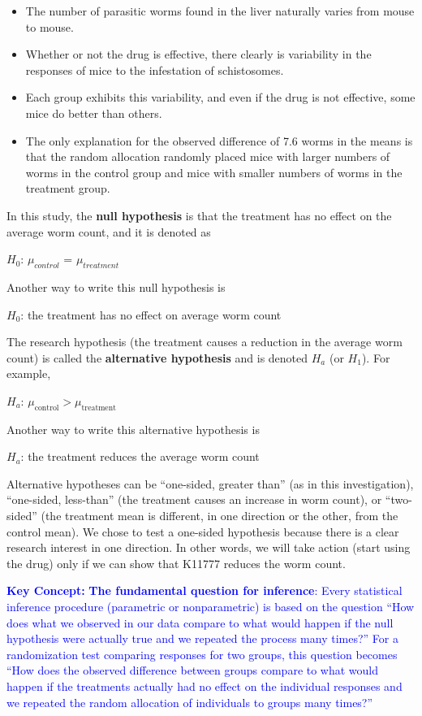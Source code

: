 \documentclass[
]{report}
\providecommand{\tightlist}{%
  \setlength{\itemsep}{0pt}\setlength{\parskip}{0pt}}
\begin{document}
\begin{itemize}
\tightlist
\item
  The number of parasitic worms found in the liver naturally varies from mouse to mouse.
\item
  Whether or not the drug is effective, there clearly is variability in the responses of mice to the infestation
  of schistosomes.
\item
  Each group exhibits this variability, and even if the drug is not effective, some mice do better than
  others.
\item
  The only explanation for the observed difference of 7.6 worms in the means is that the random
  allocation randomly placed mice with larger numbers of worms in the control group and mice with
  smaller numbers of worms in the treatment group.
\end{itemize}

In this study, the \textbf{null hypothesis} is that the treatment has no effect on the average worm count, and it
is denoted as

\(H_0\): \(\mu_{control}\) = \(\mu_{treatment}\)

Another way to write this null hypothesis is

\(H_0\): the treatment has no effect on average worm count

The research hypothesis (the treatment causes a reduction in the average worm count) is called the \textbf{alternative
hypothesis} and is denoted \(H_a\) (or \(H_1\)). For example,

\(H_a\): \(\mu_{\text{control}} > \mu_{\text{treatment}}\)

Another way to write this alternative hypothesis is

\(H_a\): the treatment reduces the average worm count

Alternative hypotheses can be ``one-sided, greater than'' (as in this investigation), ``one-sided, less-than'' (the treatment causes an increase in worm count), or ``two-sided'' (the treatment mean is different, in one direction or the other, from the control mean). We chose to test a one-sided hypothesis because there is a clear research interest in one direction. In other words, we will take action (start using the drug) only if we can show that K11777 reduces the worm count.

\textbf{\textcolor{blue}{Key Concept:}}
\textcolor{blue}{\textbf{The fundamental question for inference}: Every statistical inference procedure (parametric or nonparametric) is based on the question “How does what we observed in our data compare to what
would happen if the null hypothesis were actually true and we repeated the process many times?” For a randomization test comparing responses for two groups, this question becomes “How does the observed difference between groups compare to what would happen if the treatments actually
had no effect on the individual responses and we repeated the random allocation of individuals to groups many times?”}
\end{document}
